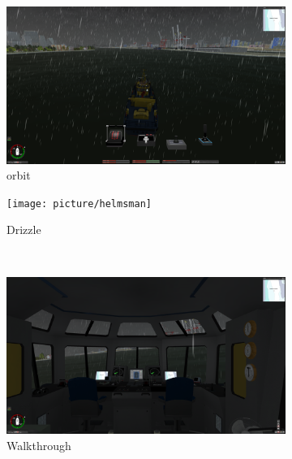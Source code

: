 \documentclass[letterpaper,10pt]{article}
\begin{document}
				\begin{figure}[htbp] 
					\centering 
					
					\begin{subfigure}{0.45\textwidth}
						\includegraphics[width=\linewidth]{picture/orbit}
						\captionsetup{font=scriptsize}
						\caption{orbit}
						\label{fig: orbit}
					\end{subfigure}
					\begin{subfigure}{0.45\textwidth}
						\texttt{[image: picture/helmsman]}
						\captionsetup{font=scriptsize}
						\caption{Drizzle}
						\label{fig: helmsman}
					\end{subfigure}\\
					\begin{subfigure}{0.45\textwidth}
						\includegraphics[width=\linewidth]{picture/walkthrough}
						\captionsetup{font=scriptsize}
						\caption{Walkthrough}
						\label{fig: walkthrough}	
					\end{subfigure}
					\begin{subfigure}{0.45\textwidth}

\end{subfigure}
\end{figure}
\end{document}
